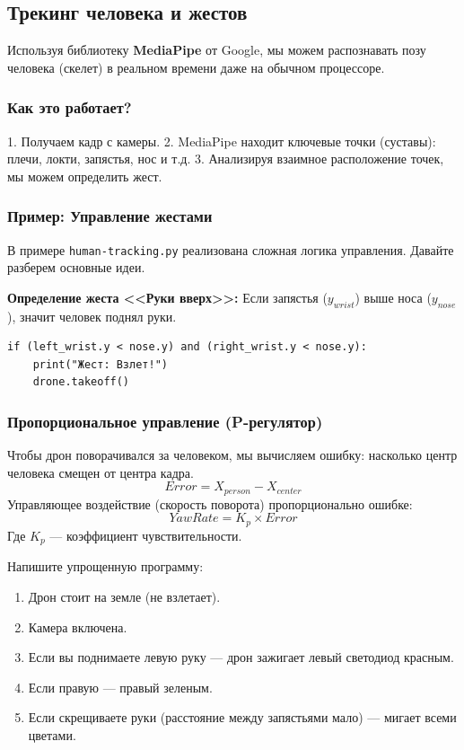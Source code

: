 \subsection{Трекинг человека и жестов}

Используя библиотеку \textbf{MediaPipe} от Google, мы можем распознавать позу человека (скелет) в реальном времени даже на обычном процессоре.

\subsubsection*{Как это работает?}
1. Получаем кадр с камеры.
2. MediaPipe находит ключевые точки (суставы): плечи, локти, запястья, нос и т.д.
3. Анализируя взаимное расположение точек, мы можем определить жест.

\subsubsection*{Пример: Управление жестами}
В примере \texttt{human-tracking.py} реализована сложная логика управления. Давайте разберем основные идеи.

\textbf{Определение жеста <<Руки вверх>>:}
Если запястья ($y_{wrist}$) выше носа ($y_{nose}$), значит человек поднял руки.

\begin{codebox}
\begin{verbatim}
if (left_wrist.y < nose.y) and (right_wrist.y < nose.y):
    print("Жест: Взлет!")
    drone.takeoff()
\end{verbatim}
\end{codebox}

\subsubsection*{Пропорциональное управление (P-регулятор)}
Чтобы дрон поворачивался за человеком, мы вычисляем ошибку: насколько центр человека смещен от центра кадра.
$$ Error = X_{person} - X_{center} $$
Управляющее воздействие (скорость поворота) пропорционально ошибке:
$$ YawRate = K_p \times Error $$
Где $K_p$ — коэффициент чувствительности.

\begin{taskbox}[Джедай]
Напишите упрощенную программу:
\begin{enumerate}
    \item Дрон стоит на земле (не взлетает).
    \item Камера включена.
    \item Если вы поднимаете левую руку — дрон зажигает левый светодиод красным.
    \item Если правую — правый зеленым.
    \item Если скрещиваете руки (расстояние между запястьями мало) — мигает всеми цветами.
\end{enumerate}
\end{taskbox}

